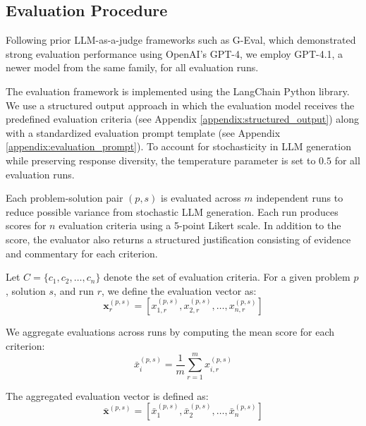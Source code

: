 \subsection{Evaluation Procedure} \label{subsection:evaluation_procedure}

Following prior LLM-as-a-judge frameworks such as G-Eval, which demonstrated strong evaluation performance using OpenAI's GPT-4, we employ GPT-4.1, a newer model from the same family, for all evaluation runs.

The evaluation framework is implemented using the LangChain Python library. We use a structured output approach in which the evaluation model receives the predefined evaluation criteria (see Appendix \ref{appendix:structured_output}) along with a standardized evaluation prompt template (see Appendix \ref{appendix:evaluation_prompt}). To account for stochasticity in LLM generation while preserving response diversity, the temperature parameter is set to $0.5$ for all evaluation runs. 

Each problem-solution pair $(p, s)$ is evaluated across $m$ independent runs to reduce possible variance from stochastic LLM generation. 
Each run produces scores for $n$ evaluation criteria using a 5-point Likert scale.
In addition to the score, the evaluator also returns a structured justification consisting of evidence and commentary for each criterion.

Let $C = \{c_1, c_2, \dots, c_n\}$ denote the set of evaluation criteria.
For a given problem $p$, solution $s$, and run $r$, we define the evaluation vector as:
\[
\mathbf{x}_{r}^{(p,s)} = \left[x_{1,r}^{(p,s)}, x_{2,r}^{(p,s)}, \dots, x_{n,r}^{(p,s)} \right]
\]

We aggregate evaluations across runs by computing the mean score for each criterion:
\[
\bar{x}_{i}^{(p,s)} = \frac{1}{m} \sum_{r=1}^{m} x_{i,r}^{(p,s)}
\]

The aggregated evaluation vector is defined as:
\[
\bar{\mathbf{x}}^{(p,s)} = \left[\bar{x}_{1}^{(p,s)}, \bar{x}_{2}^{(p,s)}, \dots, \bar{x}_{n}^{(p,s)} \right]
\]